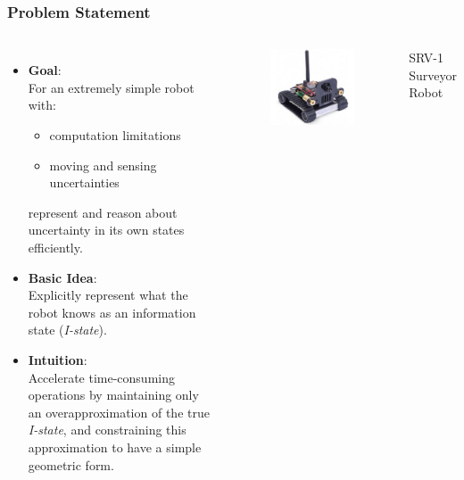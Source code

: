 \documentclass[compress]{beamer}
\begin{document}
\begin{frame}[containsverbatim] \frametitle{Problem Statement}

\begin{columns}
    \begin{itemize}
    \item \textbf{Goal}:\\
    For an extremely simple robot with:
    \begin{itemize}
    \item computation limitations
    \item moving and sensing uncertainties
    \end{itemize}
    represent and reason about uncertainty in its own states efficiently.\\
    \item \textbf{Basic Idea}:\\
    Explicitly represent what the robot knows as an information state (\textit{I-state}).
    \item \textbf{Intuition}:\\
    Accelerate time-consuming operations by maintaining only an \textcolor[rgb]{1.00,0.00,0.00}{overapproximation} of the true
    \emph{I-state}, and constraining this approximation
    to have a simple geometric form.\\
    \end{itemize}
    \begin{figure}
    \includegraphics[scale=0.27]{srvq.jpg}
    \end{figure}
    SRV-1 Surveyor Robot
\end{columns}
\transboxout
\end{frame}
\end{document}
